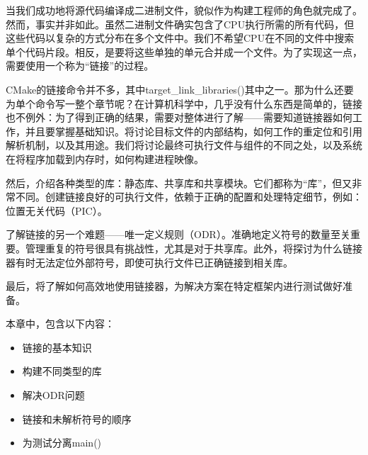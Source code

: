 当我们成功地将源代码编译成二进制文件，貌似作为构建工程师的角色就完成了。然而，事实并非如此。虽然二进制文件确实包含了CPU执行所需的所有代码，但这些代码以复杂的方式分布在多个文件中。我们不希望CPU在不同的文件中搜索单个代码片段。相反，是要将这些单独的单元合并成一个文件。为了实现这一点，需要使用一个称为“链接”的过程。

CMake的链接命令并不多，其中target\_link\_libraries()其中之一。那为什么还要为单个命令写一整个章节呢？在计算机科学中，几乎没有什么东西是简单的，链接也不例外：为了得到正确的结果，需要对整体进行了解——需要知道链接器如何工作，并且要掌握基础知识。将讨论目标文件的内部结构，如何工作的重定位和引用解析机制，以及其用途。我们将讨论最终可执行文件与组件的不同之处，以及系统在将程序加载到内存时，如何构建进程映像。

然后，介绍各种类型的库：静态库、共享库和共享模块。它们都称为“库”，但又非常不同。创建链接良好的可执行文件，依赖于正确的配置和处理特定细节，例如：位置无关代码（PIC）。

了解链接的另一个难题——唯一定义规则（ODR）。准确地定义符号的数量至关重要。管理重复的符号很具有挑战性，尤其是对于共享库。此外，将探讨为什么链接器有时无法定位外部符号，即使可执行文件已正确链接到相关库。

最后，将了解如何高效地使用链接器，为解决方案在特定框架内进行测试做好准备。

本章中，包含以下内容：

\begin{itemize}
\item
链接的基本知识

\item
构建不同类型的库

\item
解决ODR问题

\item
链接和未解析符号的顺序

\item
为测试分离main()
\end{itemize}











































